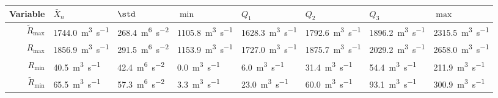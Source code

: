\begin{tabularx}{\linewidth}{r>{\centering\arraybackslash}X>{\centering\arraybackslash}X>{\centering\arraybackslash}X>{\centering\arraybackslash}X>{\centering\arraybackslash}X>{\centering\arraybackslash}X>{\centering\arraybackslash}X}
\toprule  Variable & $\bar{X}_n$ & $\std$ & $\min$ & $Q_1$ & $Q_2$ & $Q_3$ & $\max$\\\midrule
  $\tilde{R}_{\max}$ & \qty{1744.0}{\metre\cubed\per\second} & \qty{268.4}{\metre^6\per\second\squared} & \qty{1105.8}{\metre\cubed\per\second} & \qty{1628.3}{\metre\cubed\per\second} & \qty{1792.6}{\metre\cubed\per\second} & \qty{1896.2}{\metre\cubed\per\second} & \qty{2315.5}{\metre\cubed\per\second}\\\addlinespace
  $R_{\max}$ & \qty{1856.9}{\metre\cubed\per\second} & \qty{291.5}{\metre^6\per\second\squared} & \qty{1153.9}{\metre\cubed\per\second} & \qty{1727.0}{\metre\cubed\per\second} & \qty{1875.7}{\metre\cubed\per\second} & \qty{2029.2}{\metre\cubed\per\second} & \qty{2658.0}{\metre\cubed\per\second}\\\addlinespace
  $R_{\min}$ & \qty{40.5}{\metre\cubed\per\second} & \qty{42.4}{\metre^6\per\second\squared} & \qty{0.0}{\metre\cubed\per\second} & \qty{6.0}{\metre\cubed\per\second} & \qty{31.4}{\metre\cubed\per\second} & \qty{54.4}{\metre\cubed\per\second} & \qty{211.9}{\metre\cubed\per\second}\\\addlinespace
  $\tilde{R}_{\min}$ & \qty{65.5}{\metre\cubed\per\second} & \qty{57.3}{\metre^6\per\second\squared} & \qty{3.3}{\metre\cubed\per\second} & \qty{23.0}{\metre\cubed\per\second} & \qty{60.0}{\metre\cubed\per\second} & \qty{93.1}{\metre\cubed\per\second} & \qty{300.9}{\metre\cubed\per\second}\\\bottomrule
\end{tabularx}